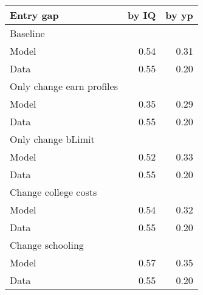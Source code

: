 \begin{tabular}{lrr}
\hline
Entry gap & by IQ  & by yp  \\ 
\hline
Baseline &   &   \\ 
Model & 0.54  & 0.31  \\ 
Data & 0.55  & 0.20  \\ 
Only change earn profiles &   &   \\ 
Model & 0.35  & 0.29  \\ 
Data & 0.55  & 0.20  \\ 
Only change bLimit &   &   \\ 
Model & 0.52  & 0.33  \\ 
Data & 0.55  & 0.20  \\ 
Change college costs &   &   \\ 
Model & 0.54  & 0.32  \\ 
Data & 0.55  & 0.20  \\ 
Change schooling &   &   \\ 
Model & 0.57  & 0.35  \\ 
Data & 0.55  & 0.20  \\ 
\hline
\end{tabular}%
